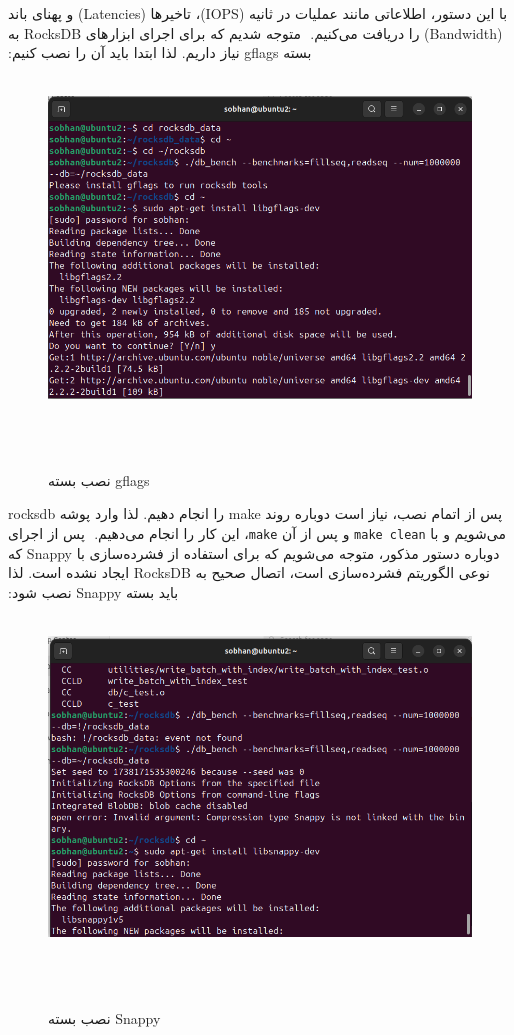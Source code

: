‫با این دستور، اطلاعاتی مانند عملیات در ثانیه (IOPS)، تاخیرها (Latencies) و پهنای باند (Bandwidth) را دریافت می‌کنیم.
‫
‫متوجه شدیم که برای اجرای ابزارهای RocksDB به بسته gflags نیاز داریم. لذا ابتدا باید آن را نصب کنیم:
‫
‫\begin{figure}[H]
‫    \centering
‫    \includegraphics[width=\textwidth]{figs/4.png}
‫    \caption{نصب بسته gflags}
‫\end{figure}
‫
‫پس از اتمام نصب، نیاز است دوباره روند make را انجام دهیم. لذا وارد پوشه rocksdb می‌شویم و با \texttt{make clean} و پس از آن \texttt{make}، این کار را انجام می‌دهیم.
‫
‫پس از اجرای دوباره دستور مذکور، متوجه می‌شویم که برای استفاده از فشرده‌سازی با Snappy که نوعی الگوریتم فشرده‌سازی است، اتصال صحیح به RocksDB ایجاد نشده است. لذا باید بسته Snappy نصب شود:
‫
‫\begin{figure}[H]
‫    \centering
‫    \includegraphics[width=\textwidth]{figs/5.png}
‫    \caption{نصب بسته Snappy}
‫\end{figure}
